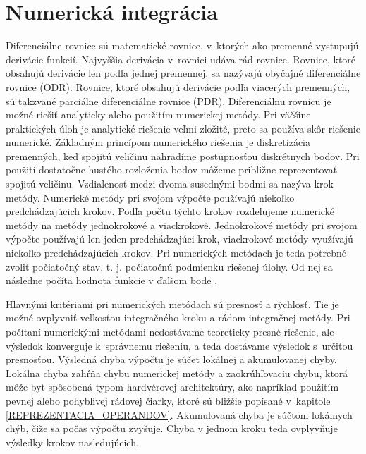 




\chapter{Numerická integrácia} \label{NUM_INTEGRACIA}
Diferenciálne rovnice sú matematické rovnice, v~ktorých ako premenné vystupujú derivácie funkcií. Najvyššia derivácia v~rovnici udáva rád rovnice. Rovnice, ktoré obsahujú derivácie len podľa jednej premennej, sa nazývajú obyčajné diferenciálne rovnice (ODR). Rovnice, ktoré obsahujú derivácie podľa viacerých premenných, sú takzvané parciálne diferenciálne rovnice (PDR).
Diferenciálnu rovnicu je možné riešiť analyticky alebo použitím numerickej metódy. Pri väčšine praktických úloh je analytické riešenie veľmi zložité, preto sa používa skôr riešenie numerické. Základným princípom numerického riešenia je diskretizácia premenných, keď spojitú veličinu nahradíme postupnosťou diskrétnych bodov. Pri použití dostatočne hustého rozloženia bodov môžeme približne reprezentovať spojitú veličinu. Vzdialenosť medzi dvoma susednými bodmi sa nazýva krok metódy. Numerické metódy pri svojom výpočte používajú niekoľko predchádzajúcich krokov. Podľa počtu týchto krokov rozdeľujeme numerické metódy na metódy jednokrokové a viackrokové. Jednokrokové metódy pri svojom výpočte používajú len jeden predchádzajúci krok, viackrokové metódy využívajú niekoľko predchádzajúcich krokov. Pri numerických metódach je teda potrebné zvoliť počiatočný stav, t. j. počiatočnú podmienku riešenej úlohy. Od nej sa následne počíta hodnota funkcie v ďalšom bode \cite{NumMetody}. 

Hlavnými kritériami pri numerických metódach sú presnosť a rýchlosť. Tie je možné ovplyvniť veľkosťou integračného kroku a rádom integračnej metódy. Pri počítaní numerickými metódami nedostávame teoreticky presné riešenie, ale výsledok konverguje k~správnemu riešeniu, a teda dostávame výsledok s~určitou presnosťou. Výsledná chyba výpočtu je súčet lokálnej a akumulovanej chyby.  Lokálna chyba zahŕňa chybu numerickej metódy a zaokrúhľovaciu chybu, ktorá môže byť spôsobená typom hardvérovej architektúry, ako napríklad použitím pevnej alebo pohyblivej rádovej čiarky, ktoré sú bližšie popísané v~kapitole \ref{REPREZENTACIA_OPERANDOV}. Akumulovaná chyba je súčtom lokálnych chýb, čiže sa počas výpočtu zvyšuje. Chyba v jednom kroku teda ovplyvňuje výsledky krokov nasledujúcich.


